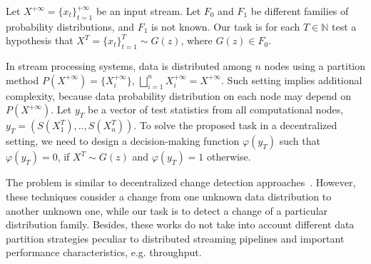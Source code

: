 \label {fs-short-model}

Let $X^{+\infty}=\{x_t\}_{t=1}^{+\infty}$ be an input stream. Let $F_0$ and $F_1$ be different families of probability distributions, and $F_1$ is not known. Our task is for each $T\in \mathbb{N}$ test a hypothesis that $X^T=\{x_t\}_{t=1}^{T} \sim G(z)$, where $G(z) \in F_0$.

In stream processing systems, data is distributed among $n$ nodes using a partition method $P(X^{+\infty})=\{X_i^{+\infty}\}$, $\bigsqcup_{i=1}^n X_i^{+\infty}=X^{+\infty}$. Such setting implies additional complexity, because data probability distribution on each node may depend on $P(X^{+\infty})$. Let $y_T$ be a vector of test statistics from all computational nodes,  $y_T = (S(X_1^T),..,S(X_n^T))$. To solve the proposed task in a decentralized setting, we need to design a decision-making function $\varphi(y_T)$ such that $\varphi(y_T) = 0$, if $X^T \sim G(z)$  and $\varphi(y_T) = 1$ otherwise.

The problem is similar to decentralized change detection approaches~\cite{tartakovsky2008asymptotically, tran2014change}. However, these techniques consider a change from one unknown data distribution to another unknown one, while our task is to detect a change of a particular distribution family. Besides, these works do not take into account different data partition strategies peculiar to distributed streaming pipelines and important performance characteristics, e.g. throughput.